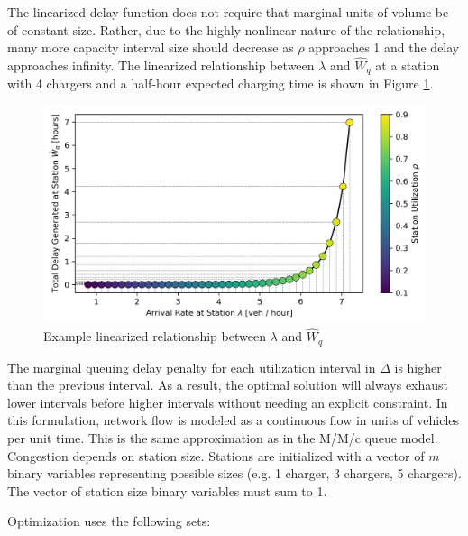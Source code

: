 The linearized delay function does not require that marginal units of volume be of constant size. Rather, due to the highly nonlinear nature of the relationship, many more capacity interval size should decrease as $\rho$ approaches 1 and the delay approaches infinity. The linearized relationship between $\lambda$ and $\hat{W}_q$ at a station with 4 chargers and a half-hour expected charging time is shown in Figure \ref{fig:linearized}.

\begin{figure}[H]
	\centering
	\includegraphics[width = \figurewidth]{./figures/linearized.png}
	\caption{Example linearized relationship between $\lambda$ and $\hat{W}_q$}
	\label{fig:linearized}
\end{figure}

The marginal queuing delay penalty for each utilization interval in $\Delta$ is higher than the previous interval. As a result, the optimal solution will always exhaust lower intervals before higher intervals without needing an explicit constraint. In this formulation, network flow is modeled as a continuous flow in units of vehicles per unit time. This is the same approximation as in the M/M/c queue model. Congestion depends on station size. Stations are initialized with a vector of $m$ binary variables representing possible sizes (e.g. 1 charger, 3 chargers, 5 chargers). The vector of station size binary variables must sum to 1.

Optimization uses the following sets:

